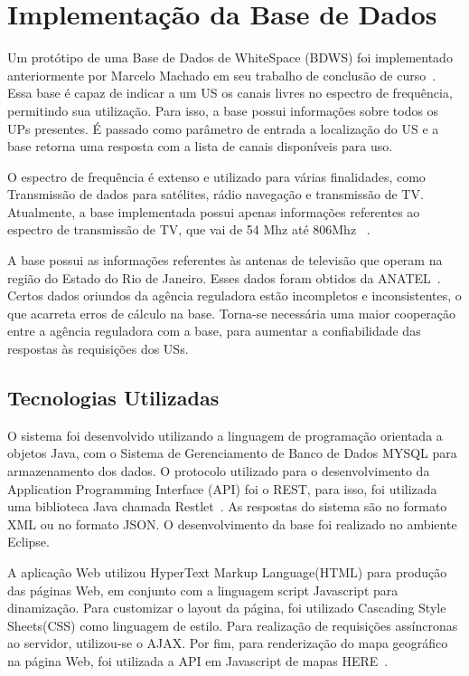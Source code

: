 
\chapter{Implementação da Base de Dados}

Um protótipo de uma Base de Dados de WhiteSpace (BDWS)
foi implementado anteriormente por Marcelo Machado em seu trabalho de conclusão de curso~\cite{tccmarcelo}. Essa base é capaz de indicar a um US os canais livres no espectro de frequência, permitindo sua utilização. Para isso, a base possui informações sobre todos os UPs presentes. É passado como parâmetro de entrada a localização do US e a base retorna uma resposta com a lista de canais disponíveis para uso.

O espectro de frequência é extenso e utilizado para várias finalidades, como Transmissão de dados para satélites, rádio navegação e transmissão de TV. Atualmente, a base implementada possui apenas informações referentes ao espectro de transmissão de TV, que vai de 54 Mhz até 806Mhz~\cite{fccalloc} .

A base possui as informações referentes às antenas de televisão que operam na região do Estado do Rio de Janeiro. Esses dados foram obtidos da ANATEL~\cite{channelstable}. Certos dados oriundos da agência reguladora estão incompletos e inconsistentes, o que acarreta erros de cálculo na base. Torna-se necessária uma maior cooperação entre a agência reguladora com a base, para aumentar a confiabilidade das respostas às requisições dos USs.

\section{Tecnologias Utilizadas}

O sistema foi desenvolvido utilizando a linguagem de programação orientada a objetos Java, com o Sistema de Gerenciamento de Banco de Dados MYSQL
para armazenamento dos dados. O protocolo utilizado para o desenvolvimento da  Application Programming Interface (API)
foi o REST, para isso, foi utilizada uma biblioteca Java chamada Restlet~\cite{restlet}. As respostas do sistema são no formato XML ou no formato JSON. O desenvolvimento da base foi realizado no ambiente Eclipse.

A aplicação Web utilizou  HyperText Markup Language(HTML)
para produção das páginas Web, em conjunto com a linguagem script Javascript para dinamização. Para customizar o layout da página, foi utilizado Cascading Style Sheets(CSS)
como linguagem de estilo. Para realização de requisições assíncronas ao servidor, utilizou-se o AJAX. Por fim, para renderização do mapa geográfico na página Web, foi utilizada a API em Javascript de mapas HERE~\cite{heremaps}. 

